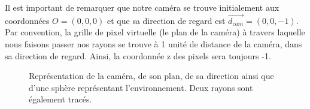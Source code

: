 \documentclass[11pt]{article}
\begin{document}
Il est important de remarquer que notre caméra se trouve initialement aux coordonnées $O = (0, 0, 0)$ et que sa direction de regard est $\overrightarrow{d_{cam}} = (0, 0, -1)$. Par convention, la grille de pixel virtuelle (le plan de la caméra) à travers laquelle nous faisons passer nos rayons se trouve à 1 unité de distance de la caméra, dans sa direction de regard. Ainsi, la coordonnée z des pixels sera toujours -1.\\
\begin{figure}[h!]

	\caption{Représentation de la caméra, de son plan, de sa direction ainsi que d'une sphère représentant l'environnement. Deux rayons sont également tracés.}
	\label{repreCamRayon}
\end{figure}
\FloatBarrier
\end{document}
